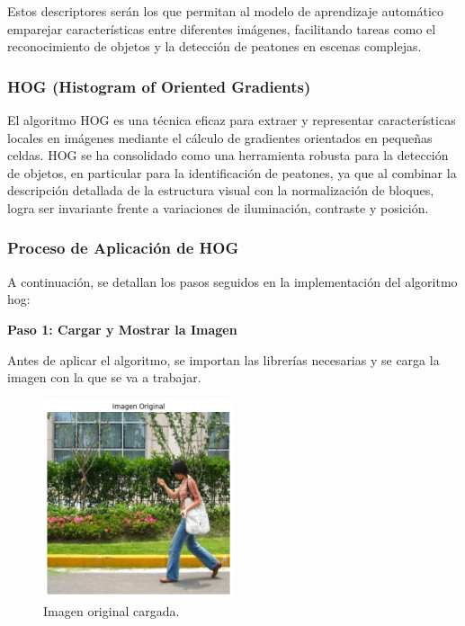\documentclass[a4paper]{article}
\begin{document}
Estos descriptores serán los que permitan al modelo de aprendizaje automático emparejar características entre diferentes imágenes, facilitando tareas como el reconocimiento de objetos y la detección de peatones en escenas complejas.


\subsubsection{HOG (Histogram of Oriented Gradients)}

El algoritmo HOG es una técnica eficaz para extraer y representar características locales en imágenes mediante el cálculo de gradientes orientados en pequeñas celdas. HOG se ha consolidado como una herramienta robusta para la detección de objetos, en particular para la identificación de peatones, ya que al combinar la descripción detallada de la estructura visual con la normalización de bloques, logra ser invariante frente a variaciones de iluminación, contraste y posición. 


\subsubsection{Proceso de Aplicación de HOG}

A continuación, se detallan los pasos seguidos en la implementación del algoritmo hog:
\par\vspace{0.5cm}

\textbf{Paso 1: Cargar y Mostrar la Imagen}
\par\vspace{0.5cm}

Antes de aplicar el algoritmo, se importan las librerías necesarias y se carga la imagen con la que se va a trabajar.

\begin{figure}[H]
    \centering
    \includegraphics[width=0.5\textwidth]{images/hog_paso_1.png}
    \caption{Imagen original cargada.}
\end{figure}
\end{document}
